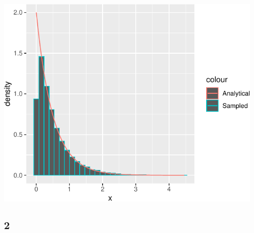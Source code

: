 \documentclass[
]{article}
\begin{document}
\begin{center}\includegraphics{Project-1_files/figure-latex/unnamed-chunk-1-1} \end{center}

\hypertarget{section-1}{%
\subsection{2}\label{section-1}}
\end{document}
